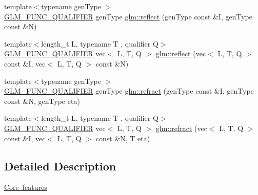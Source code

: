 \begin{DoxyCompactItemize}
\item 
{\footnotesize template$<$typename gen\+Type $>$ }\\\mbox{\hyperlink{setup_8hpp_a33fdea6f91c5f834105f7415e2a64407}{G\+L\+M\+\_\+\+F\+U\+N\+C\+\_\+\+Q\+U\+A\+L\+I\+F\+I\+ER}} gen\+Type \mbox{\hyperlink{namespaceglm_acdc166d33265ec31212f230e9db8db36}{glm\+::reflect}} (gen\+Type const \&I, gen\+Type const \&N)
\item 
{\footnotesize template$<$length\+\_\+t L, typename T , qualifier Q$>$ }\\\mbox{\hyperlink{setup_8hpp_a33fdea6f91c5f834105f7415e2a64407}{G\+L\+M\+\_\+\+F\+U\+N\+C\+\_\+\+Q\+U\+A\+L\+I\+F\+I\+ER}} vec$<$ L, T, Q $>$ \mbox{\hyperlink{group__core__func__geometric_ga5631dd1d5618de5450b1ea3cf3e94905}{glm\+::reflect}} (vec$<$ L, T, Q $>$ const \&I, vec$<$ L, T, Q $>$ const \&N)
\item 
{\footnotesize template$<$typename gen\+Type $>$ }\\\mbox{\hyperlink{setup_8hpp_a33fdea6f91c5f834105f7415e2a64407}{G\+L\+M\+\_\+\+F\+U\+N\+C\+\_\+\+Q\+U\+A\+L\+I\+F\+I\+ER}} gen\+Type \mbox{\hyperlink{namespaceglm_ae4b0245b42a72957d3026ac365731821}{glm\+::refract}} (gen\+Type const \&I, gen\+Type const \&N, gen\+Type eta)
\item 
{\footnotesize template$<$length\+\_\+t L, typename T , qualifier Q$>$ }\\\mbox{\hyperlink{setup_8hpp_a33fdea6f91c5f834105f7415e2a64407}{G\+L\+M\+\_\+\+F\+U\+N\+C\+\_\+\+Q\+U\+A\+L\+I\+F\+I\+ER}} vec$<$ L, T, Q $>$ \mbox{\hyperlink{group__core__func__geometric_ga01da3dff9e2ef6b9d4915c3047e22b74}{glm\+::refract}} (vec$<$ L, T, Q $>$ const \&I, vec$<$ L, T, Q $>$ const \&N, T eta)
\end{DoxyCompactItemize}


\subsection{Detailed Description}
\mbox{\hyperlink{group__core}{Core features}} 